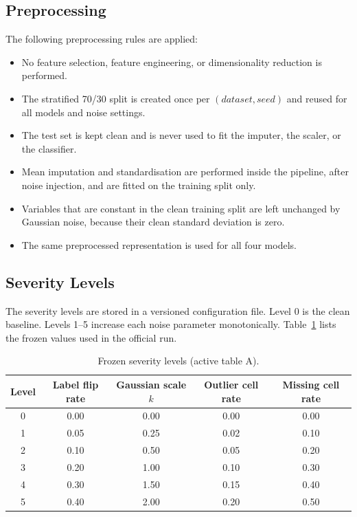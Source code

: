 \subsection{Preprocessing}

The following preprocessing rules are applied:

\begin{itemize}
  \item No feature selection, feature engineering, or dimensionality reduction is performed.
  \item The stratified 70/30 split is created once per $(dataset, seed)$ and reused for all models and noise settings.
  \item The test set is kept clean and is never used to fit the imputer, the scaler, or the classifier.
  \item Mean imputation and standardisation are performed inside the pipeline, after noise injection, and are fitted on the training split only.
  \item Variables that are constant in the clean training split are left unchanged by Gaussian noise, because their clean standard deviation is zero.
  \item The same preprocessed representation is used for all four models.
\end{itemize}

\subsection{Severity Levels}

The severity levels are stored in a versioned configuration file. Level 0 is the clean baseline. Levels 1--5 increase each noise parameter monotonically. Table~\ref{tab:levels} lists the frozen values used in the official run.

\begin{table}[H]
\centering
\caption{Frozen severity levels (active table A).}
\label{tab:levels}
\footnotesize
\begin{tabular}{ccccc}
\toprule
\textbf{Level} & \textbf{Label flip rate} & \textbf{Gaussian scale $k$} & \textbf{Outlier cell rate} & \textbf{Missing cell rate} \\
\midrule
0 & 0.00 & 0.00 & 0.00 & 0.00 \\
1 & 0.05 & 0.25 & 0.02 & 0.10 \\
2 & 0.10 & 0.50 & 0.05 & 0.20 \\
3 & 0.20 & 1.00 & 0.10 & 0.30 \\
4 & 0.30 & 1.50 & 0.15 & 0.40 \\
5 & 0.40 & 2.00 & 0.20 & 0.50 \\
\bottomrule
\end{tabular}
\end{table}


